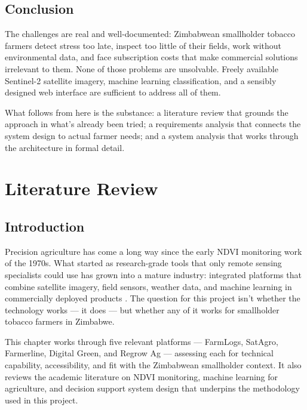 \documentclass[12pt,a4paper]{report}
\begin{document}
\section{Conclusion}

The challenges are real and well-documented: Zimbabwean smallholder tobacco farmers detect stress too late, inspect too little of their fields, work without environmental data, and face subscription costs that make commercial solutions irrelevant to them. None of those problems are unsolvable. Freely available Sentinel-2 satellite imagery, machine learning classification, and a sensibly designed web interface are sufficient to address all of them.

What follows from here is the substance: a literature review that grounds the approach in what's already been tried; a requirements analysis that connects the system design to actual farmer needs; and a system analysis that works through the architecture in formal detail.

\chapter{Literature Review}

\section{Introduction}

Precision agriculture has come a long way since the early NDVI monitoring work of the 1970s. What started as research-grade tools that only remote sensing specialists could use has grown into a mature industry: integrated platforms that combine satellite imagery, field sensors, weather data, and machine learning in commercially deployed products \citep{wolfert2017}. The question for this project isn't whether the technology works — it does — but whether any of it works for smallholder tobacco farmers in Zimbabwe.

This chapter works through five relevant platforms — FarmLogs, SatAgro, Farmerline, Digital Green, and Regrow Ag — assessing each for technical capability, accessibility, and fit with the Zimbabwean smallholder context. It also reviews the academic literature on NDVI monitoring, machine learning for agriculture, and decision support system design that underpins the methodology used in this project.
\end{document}
